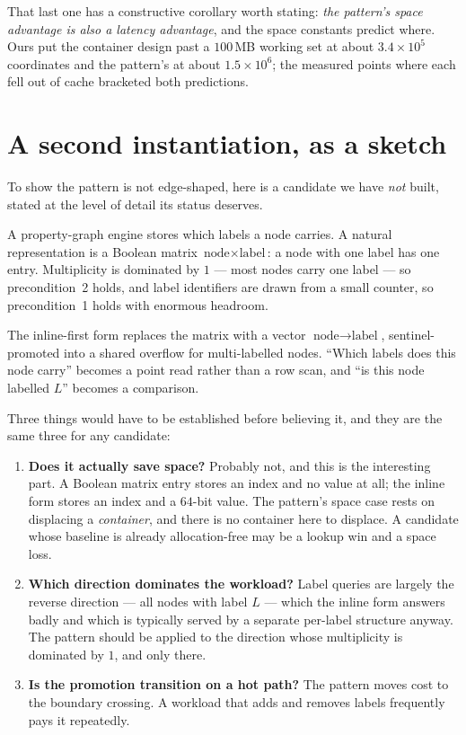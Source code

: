 \documentclass[11pt,a4paper]{article}
\theoremstyle{plain}
\theoremstyle{definition}
\theoremstyle{remark}
\begin{document}
That last one has a constructive corollary worth stating: \emph{the pattern's
space advantage is also a latency advantage}, and the space constants predict
where. Ours put the container design past a $100$\,MB working set at about
$3.4\times10^5$ coordinates and the pattern's at about $1.5\times10^6$; the
measured points where each fell out of cache bracketed both predictions.

\section{A second instantiation, as a sketch}
\label{sec:labels}

To show the pattern is not edge-shaped, here is a candidate we have
\emph{not} built, stated at the level of detail its status deserves.

A property-graph engine stores which labels a node carries. A natural
representation is a Boolean matrix $\text{node} \times \text{label}$: a node
with one label has one entry. Multiplicity is dominated by $1$ --- most nodes
carry one label --- so precondition~2 holds, and label identifiers are drawn
from a small counter, so precondition~1 holds with enormous headroom.

The inline-first form replaces the matrix with a vector
$\text{node} \to \text{label}$, sentinel-promoted into a shared overflow for
multi-labelled nodes. ``Which labels does this node carry'' becomes a point
read rather than a row scan, and ``is this node labelled $L$'' becomes a
comparison.

Three things would have to be established before believing it, and they are the
same three for any candidate:

\begin{enumerate}
  \item \textbf{Does it actually save space?} Probably not, and this is the
    interesting part. A Boolean matrix entry stores an index and no value at
    all; the inline form stores an index and a $64$-bit value. The pattern's
    space case rests on displacing a \emph{container}, and there is no
    container here to displace. A candidate whose baseline is already
    allocation-free may be a lookup win and a space loss.
  \item \textbf{Which direction dominates the workload?} Label queries are
    largely the reverse direction --- all nodes with label $L$ --- which the
    inline form answers badly and which is typically served by a separate
    per-label structure anyway. The pattern should be applied to the direction
    whose multiplicity is dominated by $1$, and only there.
  \item \textbf{Is the promotion transition on a hot path?} The pattern moves
    cost to the boundary crossing. A workload that adds and removes labels
    frequently pays it repeatedly.
\end{enumerate}
\end{document}
